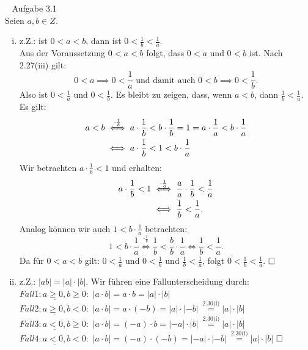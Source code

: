 \begin{lsg}\mbox{ }
Aufgabe 3.1 \\
Seien \(a,b \in Z\).
\begin{enumerate}[i)]
	\item z.Z.: ist \(0<a<b\), dann ist \(0<\frac{1}{b}<\frac{1}{a}\). \\
		Aus der Voraussetzung \(0<a<b\) folgt, dass  \(0<a\) und \(0<b\) ist. Nach 2.27(iii) gilt: \[0<a\implies 0<\frac{1}{a} \text{ und damit auch } 0<b\implies 0<\frac{1}{b}.\]
		Also ist \(0<\frac{1}{a}\) und \(0<\frac{1}{b}\). Es bleibt zu zeigen, dass, wenn \(a<b\), dann \(\frac{1}{b}<\frac{1}{a}\). \\
		Es gilt: 
		\begin{align} a<b &\overset{\cdot \frac{1}{b}}{\iff} a \cdot \frac{1}{b} < b \cdot \frac{1}{b} = 1 = a \cdot \frac{1}{a} < b \cdot \frac{1}{a} \notag \\ &\iff a \cdot \frac{1}{b} < 1 < b \cdot \frac{1}{a} \notag \end{align}
		Wir betrachten \(a \cdot \frac{1}{b} < 1 \) und erhalten: \begin{align} a \cdot \frac{1}{b} < 1 &\overset{\cdot \frac{1}{a}}{\iff} \frac{a}{a} \cdot \frac{1}{b}<\frac{1}{a} \notag \\ &\iff \frac{1}{b}<\frac{1}{a}. \notag \end{align}
		Analog können wir auch \(1 < b \cdot \frac{1}{a}\) betrachten: \[1 < b \cdot \frac{1}{a} \overset{\cdot \frac{1}{b}}{\iff} \frac{1}{b} < \frac{b}{b}\cdot\frac{1}{a} \iff \frac{1}{b}<\frac{1}{a}.\]
		Da für \(0<a<b\) gilt: \(0<\frac{1}{a}\) und \(0<\frac{1}{b}\) und \(\frac{1}{b}<\frac{1}{a}\), folgt  \(0<\frac{1}{b}<\frac{1}{a}\). \(\hfill \square\)
	\item z.Z.: \(|ab|=|a|\cdot |b|\). Wir führen eine Fallunterscheidung durch: \\
		\(\underline{Fall 1: a\geq 0, b\geq 0:}\) \quad \(|a\cdot b| = a \cdot b = |a|\cdot |b|\) \\
		\(\underline{Fall 2: a\geq 0, b< 0:}\) \quad \(|a\cdot b| = a \cdot (-b) = |a|\cdot |-b|\ \overset{\text{2.30(i)}}{=} |a|\cdot |b|\) \\
		\(\underline{Fall 3: a< 0, b\geq 0:}\) \quad \(|a\cdot b| = (-a) \cdot b = |-a|\cdot |b|\ \overset{\text{2.30(i)}}{=} |a|\cdot |b|\) \\
		\(\underline{Fall 4: a< 0, b< 0:}\) \quad \(|a\cdot b| = (-a) \cdot (-b) = |-a|\cdot |-b|\ \overset{\text{2.30(i)}}{=} |a|\cdot |b|\) \(\hfill \square\) \\

\end{enumerate}
\end{lsg}

